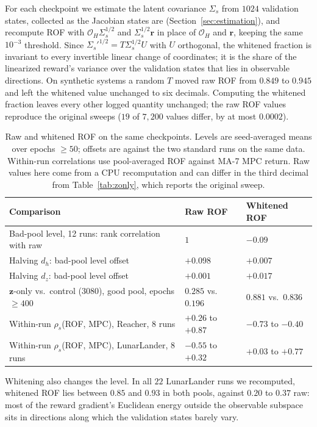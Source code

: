 \documentclass[11pt]{article}
\theoremstyle{remark}
\begin{document}
For each checkpoint we estimate the latent covariance $\Sigma_s$ from $1024$ validation states, collected as the Jacobian states are (Section~\ref{sec:estimation}), and recompute ROF with $\mathcal{O}_H \Sigma_s^{1/2}$ and $\Sigma_s^{1/2}\bm{r}$ in place of $\mathcal{O}_H$ and $\bm{r}$, keeping the same $10^{-3}$ threshold. Since $\Sigma_s'^{1/2} = T\Sigma_s^{1/2}U$ with $U$ orthogonal, the whitened fraction is invariant to every invertible linear change of coordinates; it is the share of the linearized reward's variance over the validation states that lies in observable directions. On synthetic systems a random $T$ moved raw ROF from $0.849$ to $0.945$ and left the whitened value unchanged to six decimals. Computing the whitened fraction leaves every other logged quantity unchanged; the raw ROF values reproduce the original sweeps ($19$ of $7{,}200$ values differ, by at most $0.0002$).

\begin{table}[htbp]
\centering
\small
\begin{tabular}{@{}l l l@{}}
\toprule
\textbf{Comparison} & \textbf{Raw ROF} & \textbf{Whitened ROF} \\
\midrule
Bad-pool level, 12 runs: rank correlation with raw & $1$ & $-0.09$ \\
Halving $d_h$: bad-pool level offset & $+0.098$ & $+0.007$ \\
Halving $d_z$: bad-pool level offset & $+0.001$ & $+0.017$ \\
$\bm{z}$-only vs.\ control (3080), good pool, epochs $\ge 400$ & $0.285$ vs.\ $0.196$ & $0.881$ vs.\ $0.836$ \\
Within-run $\rho_s$(ROF, MPC), Reacher, 8 runs & $+0.26$ to $+0.87$ & $-0.73$ to $-0.40$ \\
Within-run $\rho_s$(ROF, MPC), LunarLander, 8 runs & $-0.55$ to $+0.32$ & $+0.03$ to $+0.77$ \\
\bottomrule
\end{tabular}
\caption{Raw and whitened ROF on the same checkpoints. Levels are seed-averaged means over epochs $\ge 50$; offsets are against the two standard runs on the same data. Within-run correlations use pool-averaged ROF against MA-7 MPC return. Raw values here come from a CPU recomputation and can differ in the third decimal from Table~\ref{tab:zonly}, which reports the original sweep.}
\label{tab:coords}
\end{table}

Whitening also changes the level. In all $22$ LunarLander runs we recomputed, whitened ROF lies between $0.85$ and $0.93$ in both pools, against $0.20$ to $0.37$ raw: most of the reward gradient's Euclidean energy outside the observable subspace sits in directions along which the validation states barely vary.
\end{document}
